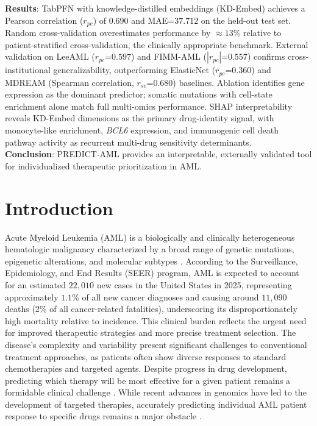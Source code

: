 \documentclass[pdflatex,sn-mathphys-num]{sn-jnl}
\theoremstyle{thmstyleone}
\theoremstyle{thmstyletwo}
\theoremstyle{thmstylethree}
\begin{document}
{\textbf{Results}: TabPFN with knowledge-distilled embeddings (KD-Embed) achieves a Pearson correlation ($r_{pc}$) of $0.690$ and MAE=$37.712$ on the held-out test set. Random cross-validation overestimates performance by $\approx13\%$ relative to patient-stratified cross-validation, the clinically appropriate benchmark. External validation on LeeAML ($r_{pc}$=$0.597$) and FIMM-AML ($|r_{pc}|$=$0.557$) confirms cross-institutional generalizability, outperforming ElasticNet ($r_{pc}$=$0.360$) and MDREAM (Spearman correlation, $r_{sc}$=$0.680$) baselines. Ablation identifies gene expression as the dominant predictor; somatic mutations with cell-state enrichment alone match full multi-omics performance. SHAP interpretability reveals KD-Embed dimensions as the primary drug-identity signal, with monocyte-like enrichment, \textit{BCL6} expression, and immunogenic cell death pathway activity as recurrent multi-drug sensitivity determinants. \\
\textbf{Conclusion}: PREDICT-AML provides an interpretable, externally validated tool for individualized therapeutic prioritization in AML.
}


\maketitle

\section{Introduction}\label{sec1}
Acute Myeloid Leukemia (AML) is a biologically and clinically heterogeneous hematologic malignancy characterized by a broad range of genetic mutations, epigenetic alterations, and molecular subtypes \cite{cancer2013genomic,papaemmanuil2016genomic,kurzer2023updates,tyner2018functional}. According to the Surveillance, Epidemiology, and End Results (SEER) program, AML is expected to account for an estimated $22{,}010$ new cases in the United States in 2025, representing approximately $1.1\%$ of all new cancer diagnoses and causing around $11{,}090$ deaths ($2\%$ of all cancer-related fatalities), underscoring its disproportionately high mortality relative to incidence. This clinical burden reflects the urgent need for improved therapeutic strategies and more precise treatment selection. The disease's complexity and variability present significant challenges to conventional treatment approaches, as patients often show diverse responses to standard chemotherapies and targeted agents. Despite progress in drug development, predicting which therapy will be most effective for a given patient remains a formidable clinical challenge \cite{tyner2018functional,yu2020advances}. While recent advances in genomics have led to the development of targeted therapies, accurately predicting individual AML patient response to specific drugs remains a major obstacle \cite{shafiei2025omics}.
\end{document}

